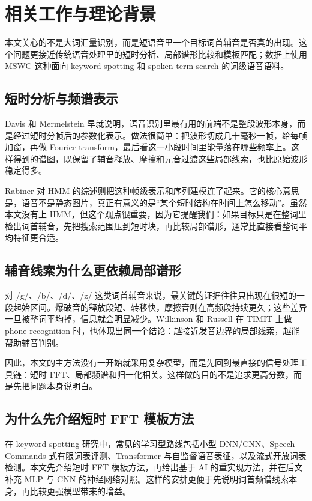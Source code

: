 \section{相关工作与理论背景}

本文关心的不是大词汇量识别，而是短语音里一个目标词首辅音是否真的出现。这个问题更接近传统语音处理里的短时分析、局部谱形比较和模板匹配；数据上使用 MSWC 这种面向 keyword spotting 和 spoken term search 的词级语音语料\cite{mazumder2021mswc}。

\subsection{短时分析与频谱表示}

Davis 和 Mermelstein 早就说明，语音识别里最有用的前端不是整段波形本身，而是经过短时分帧后的参数化表示\cite{davis1980}。做法很简单：把波形切成几十毫秒一帧，给每帧加窗，再做 Fourier transform，最后看这一小段时间里能量落在哪些频率上。这样得到的谱图，既保留了辅音释放、摩擦和元音过渡这些局部线索，也比原始波形稳定得多。

Rabiner 对 HMM 的综述则把这种帧级表示和序列建模连了起来\cite{rabiner1989}。它的核心意思是，语音不是静态图片，真正有意义的是“某个短时结构在时间上怎么移动”。虽然本文没有上 HMM，但这个观点很重要，因为它提醒我们：如果目标只是在整词里检出词首辅音，先把搜索范围压到短时块，再比较局部谱形，通常比直接看整词平均特征更合适。

\subsection{辅音线索为什么更依赖局部谱形}

对 /g/、/b/、/d/、/z/ 这类词首辅音来说，最关键的证据往往只出现在很短的一段起始区间。爆破音的释放段短、转移快，摩擦音则在高频段持续更久；这些差异一旦被整词平均掉，信息就会明显减少。Wilkinson 和 Russell 在 TIMIT 上做 phone recognition 时，也体现出同一个结论：越接近发音边界的局部线索，越能帮助辅音判别\cite{wilkinson2002}。

因此，本文的主方法没有一开始就采用复杂模型，而是先回到最直接的信号处理工具链：短时 FFT、局部频谱和归一化相关。这样做的目的不是追求更高分数，而是先把问题本身说明白。

\subsection{为什么先介绍短时 FFT 模板方法}

在 keyword spotting 研究中，常见的学习型路线包括小型 DNN/CNN\cite{chen2014kws,sainath2015}、Speech Commands 式有限词表评测\cite{warden2018}、Transformer 与自监督语音表征\cite{berg2021,baevski2020,hsu2021hubert,chen2022wavlm,gao2023}，以及流式开放词表检测\cite{kim2025}。本文先介绍短时 FFT 模板方法，再给出基于 AI 的重实现方法，并在后文补充 MLP 与 CNN 的神经网络对照。这样的安排更便于先说明词首频谱线索本身，再比较更强模型带来的增益。
